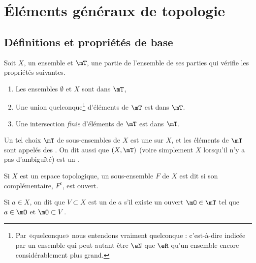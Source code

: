 
\section{Éléments généraux de topologie}

\subsection{Définitions et propriétés de base}

\begin{definition}		\label{DefTopologieGene}
Soit \( X \), un ensemble et \( \mT \), une partie de l'ensemble de ses parties qui vérifie les propriétés suivantes.
\begin{enumerate}
\item
  Les ensembles \( \emptyset \) et \( X \) sont dans \( \mT \),
\item
  Une union quelconque\footnote{Par «quelconque» nous entendons vraiment quelconque : c'est-à-dire indicée par un ensemble qui peut autant être \( \eN\) que \( \eR\) qu'un ensemble encore considérablement plus grand.} d'éléments de \( \mT\) est dans \( \mT\).
\item
  Une intersection \emph{finie} d'éléments de \( \mT\) est dans \( \mT\).
\end{enumerate}
Un tel choix \( \mT \) de sous-ensembles de \( X \) est une   sur \( X \), et les éléments de \( \mT \) sont appelés des . On dit aussi que \( (X,\mT) \) (voire simplement \( X \) lorsqu'il n'y a pas d'ambiguïté) est un .
\end{definition}

\begin{definition}		\label{DefFermeVoisinage}
Si \(X \) est un espace topologique, un sous-ensemble \( F \) de \( X \) est dit  si son complémentaire, \( F^c \), est ouvert.

Si \(a \in X\), on dit que \(V \subset X\) est un  de \(a\) s'il existe un ouvert \(\mO \in \mT\) tel que \(a \in \mO\) et \(\mO \subset V\).
\end{definition}

